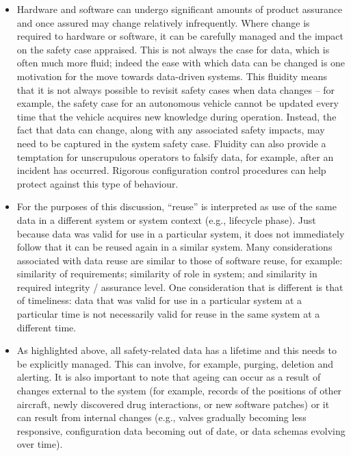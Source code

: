 \begin{itemize}
  \item {} Hardware and software can undergo significant amounts of product assurance and once assured may change relatively infrequently. Where change is required to hardware or software, it can be carefully managed and the impact on the safety case appraised. This is not always the case for data, which is often much more fluid; indeed the ease with which data can be changed is one motivation for the move towards \glspl{data-driven system}. This fluidity means that it is not always possible to revisit safety cases when data changes -- for example, the safety case for an autonomous vehicle cannot be updated every time that the vehicle acquires new knowledge during operation. Instead, the fact that data can change, along with any associated safety impacts, may need to be captured in the system safety case. Fluidity can also provide a temptation for unscrupulous operators to falsify data, for example, after an incident has occurred. Rigorous configuration control procedures can help protect against this type of behaviour.

  \item {} For the purposes of this discussion, ``reuse'' is interpreted as use of the same data in a different system or system context (e.g., lifecycle phase). Just because data was valid for use in a particular system, it does not immediately follow that it can be reused again in a similar system. Many considerations associated with data reuse are similar to those of software reuse, for example: similarity of requirements; similarity of role in system; and similarity in required \gls{integrity} / assurance level. One consideration that is different is that of \gls{timeliness}: data that was valid for use in a particular system at a particular time is not necessarily valid for reuse in the same system at a different time.

  \item {} As highlighted above, all safety-related data has a lifetime and this needs to be explicitly managed. This can involve, for example, purging, deletion and alerting. It is also important to note that ageing can occur as a result of changes external to the system (for example, records of the positions of other aircraft, newly discovered drug interactions, or new software patches) or it can result from internal changes (e.g., valves gradually becoming less responsive, \gls{configuration data} becoming out of date, or data schemas evolving over time).


\end{itemize}
